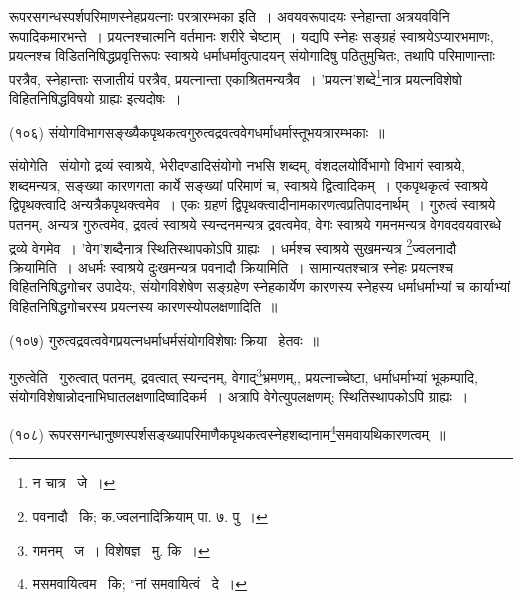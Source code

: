 \documentclass[11pt, openany]{book}
\begin{document}
{रूपरसगन्धस्पर्शपरिमाणस्नेहप्रयत्नाः परत्रारम्भका इति~। अवयवरूपादयः स्नेहान्ता अत्रयवविनि रूपादिकमारभन्ते~। प्रयत्नश्चात्मनि वर्तमानः शरीरे चेष्टाम्~। यद्यपि स्नेहः सङ्ग्रहं स्वाश्रयेऽप्यारभमाणः, प्रयत्नश्च विडितनिषिद्धप्रवृत्तिरूपः स्वाश्रये धर्माधर्मावुत्पादयन् संयोगादिषु पठितुमुचितः, तथापि परिमाणान्ताः परत्रैव, स्नेहान्ताः सजातीयं परत्रैव, प्रयत्नान्ता एकाश्रितमन्यत्रैव~। 'प्रयत्न'शब्दे\renewcommand{\thefootnote}{2}\footnote{न चात्र \textendash\ जे~।}नात्र प्रयत्नविशेषो विहितनिषिद्धविषयो ग्राह्यः इत्यदोषः~। 

\begin{sloppypar}
\hangindent=2cm {\knu (१०६) संयोगविभागसङ्ख्यैकपृथकत्वगुरुत्वद्रवत्ववेगधर्माधर्मास्तूभयत्रारम्भकाः~॥}
\end{sloppypar}

{\knu संयोगेति} \textendash\ संयोगो द्रव्यं स्वाश्रये, भेरीदण्डादिसंयोगो नभसि शब्दम्, वंशदलयोर्विभागो विभागं स्वाश्रये, शब्दमन्यत्र, सङ्ख्या कारणगता कार्ये सङ्ख्यां परिमाणं च, स्वाश्रये द्वित्वादिकम्~। एकपृथकृत्वं स्वाश्रये द्विपृथक्त्वादि अन्यत्रैकपृथक्त्वमेव~। एकः ग्रहणं द्विपृथक्त्वादीनामकारणत्वप्रतिपादनार्थम्~। गुरुत्वं स्वाश्रये पतनम्, अन्यत्र गुरुत्वमेव, द्रवत्वं स्वाश्रये स्यन्दनमन्यत्र द्रवत्वमेव, वेगः स्वाश्रये गमनमन्यत्र वेगवदवयवारब्धे द्रव्ये वेगमेव~। 'वेग'शब्दैनात्र स्थितिस्थापकोऽपि ग्राह्यः~। धर्मश्च स्वाश्रये सुखमन्यत्र \renewcommand{\thefootnote}{3}\footnote{पवनादौ \textendash\ कि; क.ज्वलनादिक्रियाम् पा. ७. पु~।}ज्वलनादौ क्रियामिति~। अधर्मः स्वाश्रये दुःखमन्यत्र पवनादौ क्रियामिति~। सामान्यतश्चात्र स्नेहः प्रयत्नश्च विहितनिषिद्धगोचर उपादेयः, संयोगविशेषेण सङ्ग्रहेण स्नेहकार्येण कारणस्य स्नेहस्य धर्माधर्माभ्यां च कार्याभ्यां विहितनिषिद्धगोचरस्य प्रयत्नस्य कारणस्योपलक्षणादिति~॥

\hangindent=2cm {\knu (१०७) गुरुत्वद्रवत्ववेगप्रयत्नधर्माधर्मसंयोगविशेषाः क्रिया \textendash\ हेतवः~॥}

\newpage
{\knu गुरुत्वे}ति \textendash\ गुरुत्वात् पतनम्, द्रवत्वात् स्यन्दनम्, वेगाद्\renewcommand{\thefootnote}{1}\footnote{गमनम् \textendash\ ज~। विशेषज्ञ \textendash\ मु. कि~।}भ्रमणम्,, प्रयत्नाच्चेष्टा, धर्माधर्माभ्यां भूकम्पादि, संयोगविशेषान्नोदनाभिघातलक्षणादिष्वादिकर्म~। अत्रापि वेगेत्युपलक्षणम्; स्थितिस्थापकोऽपि ग्राह्यः~।

\begin{sloppypar}
\hangindent=2cm {\knu (१०८) रूपरसगन्धानुष्णस्पर्शसङ्ख्यापरिमाणैकपृथकत्वस्नेहशब्दानाम\renewcommand{\thefootnote}{2}\footnote{मसमवायित्वम \textendash\ कि;  ${}^\circ$नां समवायित्वं \textendash\ दे~।}समवायथिकारणत्वम्~॥} 
\end{sloppypar}

}
\end{document}

